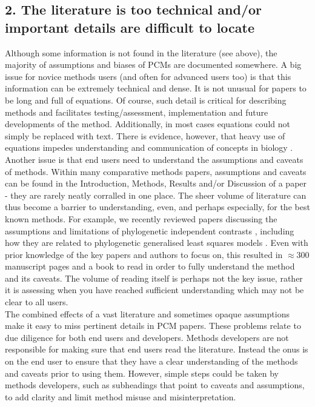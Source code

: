 \documentclass[a4paper,12pt]{article}
\begin{document}
  \subsection{2. The literature is too technical and/or important details are difficult to locate}
    Although some information is not found in the literature (see above), the majority of assumptions and biases of PCMs are documented somewhere. 
    A big issue for novice methods users (and often for advanced users too) is that this information can be extremely technical and dense.
    It is not unusual for papers to be long and full of equations. 
    Of course, such detail is critical for describing methods and facilitates testing/assessment, implementation and future developments of the method.
    Additionally, in most cases equations could not simply be replaced with text.
    There is evidence, however, that heavy use of equations impedes understanding and communication of concepts in biology \citep{fawcett2012heavy}.\\
    
    Another issue is that end users need to understand the assumptions and caveats of methods.
    Within many comparative methods papers, assumptions and caveats can be found in the Introduction, Methods, Results and/or Discussion of a paper - they are rarely neatly corralled in one place.
    The sheer volume of literature can thus become a barrier to understanding, even, and perhaps especially, for the best known methods.
    For example, we recently reviewed papers discussing the assumptions and limitations of phylogenetic independent contrasts \citep{felsenstein1985phylogenies}, including how they are related to phylogenetic generalised least squares models \citep{garland2000using,rohle2006comment,blomberg2012independent}. 
    Even with prior knowledge of the key papers and authors to focus on, this resulted in $\approx 300$ manuscript pages and a book to read in order to fully understand the method and its caveats.
    The volume of reading itself is perhaps not the key issue, rather it is assessing when you have reached sufficient understanding which may not be clear to all users.\\

    The combined effects of a vast literature and sometimes opaque assumptions make it easy to miss pertinent details in PCM papers.
    These problems relate to due diligence for both end users and developers. 
    Methods developers are not responsible for making sure that end users read the literature. 
    Instead the onus is on the end user to ensure that they have a clear understanding of the methods and caveats prior to using them. 
    However, simple steps could be taken by methods developers, such as subheadings that point to caveats and assumptions, to add clarity and limit method misuse and misinterpretation. 
\end{document}
